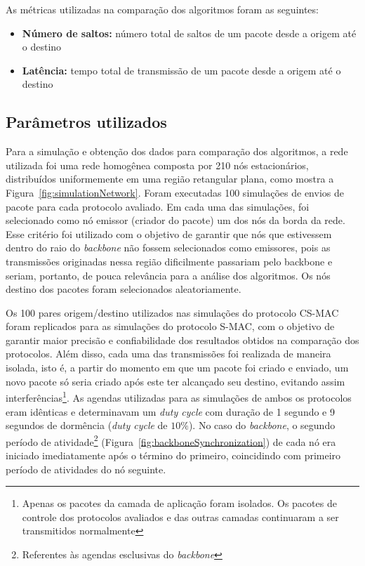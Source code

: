 As métricas utilizadas na comparação dos algoritmos foram as seguintes:

\begin{itemize}
\item \textbf{Número de saltos:} número total de saltos de um pacote desde a origem até o destino
\item \textbf{Latência:} tempo total de transmissão de um pacote desde a origem até o destino
\end{itemize} 

\subsection{Parâmetros utilizados}

Para a simulação e obtenção dos dados para comparação dos algoritmos, a rede utilizada foi uma rede homogênea composta por 210 nós estacionários, distribuídos uniformemente em uma região retangular plana, como mostra a Figura~\ref{fig:simulationNetwork}. Foram executadas 100 simulações de envios de pacote para cada protocolo avaliado. Em cada uma das simulações, foi selecionado como nó emissor (criador do pacote) um dos nós da borda da rede. Esse critério foi utilizado com o objetivo de garantir que nós que estivessem dentro do raio do \emph{backbone} não fossem selecionados como emissores, pois as transmissões originadas nessa região dificilmente passariam pelo backbone e seriam, portanto, de pouca relevância para a análise dos algoritmos. Os nós destino dos pacotes foram selecionados aleatoriamente.

Os 100 pares origem/destino utilizados nas simulações do protocolo CS-MAC foram replicados para as simulações do protocolo S-MAC, com o objetivo de garantir maior precisão e confiabilidade dos resultados obtidos na comparação dos protocolos. Além disso, cada uma das transmissões foi realizada de maneira isolada, isto é, a partir do momento em que um pacote foi criado e enviado, um novo pacote só seria criado após este ter alcançado seu destino, evitando assim interferências\footnote{Apenas os pacotes da camada de aplicação foram isolados. Os pacotes de controle dos protocolos avaliados e das outras camadas continuaram a ser transmitidos normalmente}. As agendas utilizadas para as simulações de ambos os protocolos eram idênticas e determinavam um \emph{duty cycle} com duração de 1 segundo e 9 segundos de dormência (\emph{duty cycle} de $10\%$). No caso do \emph{backbone}, o segundo período de atividade\footnote{Referentes às agendas esclusivas do \emph{backbone}} (Figura~\ref{fig:backboneSynchronization}) de cada nó era iniciado imediatamente após o término do primeiro, coincidindo com primeiro período de atividades do nó seguinte.   

